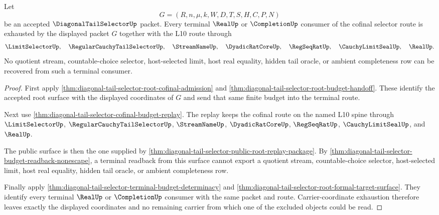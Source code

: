 \begin{theorem}
\label{thm:diagonal-tail-selector-terminal-cofinal-route-exhaustion}
Let
$$
G=(R,n,\mu,k,W,D,T,S,H,C,P,N)
$$
be an accepted $\DiagonalTailSelectorUp$ packet. Every terminal $\RealUp$ or
$\CompletionUp$ consumer of the cofinal selector route is exhausted by the
displayed packet $G$ together with the L10 route through
$$
\LimitSelectorUp,\quad
\RegularCauchyTailSelectorUp,\quad
\StreamNameUp,\quad
\DyadicRatCoreUp,\quad
\RegSeqRatUp,\quad
\CauchyLimitSealUp,\quad
\RealUp.
$$
No quotient stream, countable-choice selector, host-selected limit, host real
equality, hidden tail oracle, or ambient completeness row can be recovered from
such a terminal consumer.
\end{theorem}
\begin{proof}
First apply
\autoref{thm:diagonal-tail-selector-root-cofinal-admission} and
\autoref{thm:diagonal-tail-selector-root-budget-handoff}. These identify the
accepted root surface with the displayed coordinates of $G$ and send that same
finite budget into the terminal route.

Next use
\autoref{thm:diagonal-tail-selector-cofinal-budget-replay}. The replay keeps
the cofinal route on the named L10 spine through $\LimitSelectorUp$,
$\RegularCauchyTailSelectorUp$, $\StreamNameUp$, $\DyadicRatCoreUp$,
$\RegSeqRatUp$, $\CauchyLimitSealUp$, and $\RealUp$.

The public surface is then the one supplied by
\autoref{thm:diagonal-tail-selector-public-root-replay-package}. By
\autoref{thm:diagonal-tail-selector-budget-readback-nonescape}, a terminal
readback from this surface cannot export a quotient stream, countable-choice
selector, host-selected limit, host real equality, hidden tail oracle, or
ambient completeness row.

Finally apply
\autoref{thm:diagonal-tail-selector-terminal-budget-determinacy} and
\autoref{thm:diagonal-tail-selector-root-formal-target-surface}. They identify
every terminal $\RealUp$ or $\CompletionUp$ consumer with the same packet and
route. Carrier-coordinate exhaustion therefore leaves exactly the displayed
coordinates and no remaining carrier from which one of the excluded objects
could be read.
\end{proof}

